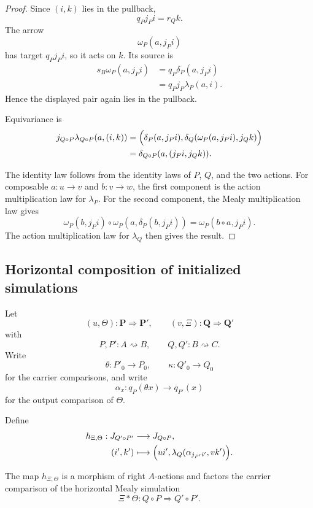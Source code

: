 \begin{proof}
Since \((i,k)\) lies in the pullback,
\[
  q_Pj_Pi=r_Qk.
\]
The arrow
\[
  \omega_P(a,j_Pi)
\]
has target \(q_Pj_Pi\), so it acts on \(k\). Its source is
\[
\begin{aligned}
  s_B\omega_P(a,j_Pi)
  &=
  q_P\delta_P(a,j_Pi)
  \\
  &=
  q_Pj_P\lambda_P(a,i).
\end{aligned}
\]
Hence the displayed pair again lies in the pullback.

Equivariance is
\[
\begin{aligned}
  j_{Q\circ P}
  \lambda_{Q\circ P}(a,(i,k))
  &=
  \Bigl(
    \delta_P(a,j_Pi),
    \delta_Q(\omega_P(a,j_Pi),j_Qk)
  \Bigr)
  \\
  &=
  \delta_{Q\circ P}
  (a,(j_Pi,j_Qk)).
\end{aligned}
\]

The identity law follows from the identity laws of \(P\), \(Q\), and the two actions. For composable
\(a:u\to v\) and \(b:v\to w\), the first component is the action multiplication law for
\(\lambda_P\). For the second component, the Mealy multiplication law gives
\[
  \omega_P(b,j_Pi)
  \circ
  \omega_P(a,\delta_P(b,j_Pi))
  =
  \omega_P(b\circ a,j_Pi).
\]
The action multiplication law for \(\lambda_Q\) then gives the result.
\end{proof}

\subsection{Horizontal composition of initialized simulations}

Let
\[
  (u,\Theta):\mathbf P\Longrightarrow\mathbf P',
  \qquad
  (v,\Xi):\mathbf Q\Longrightarrow\mathbf Q'
\]
with
\[
  P,P':A\rightsquigarrow B,
  \qquad
  Q,Q':B\rightsquigarrow C.
\]
Write
\[
  \theta:P'_0\to P_0,
  \qquad
  \kappa:Q'_0\to Q_0
\]
for the carrier comparisons, and write
\[
  \alpha_x:
  q_P(\theta x)\longrightarrow q_{P'}(x)
\]
for the output comparison of \(\Theta\).

Define
\[
\begin{aligned}
  h_{\Xi,\Theta}:
  J_{Q'\circ P'}
  &\longrightarrow
  J_{Q\circ P},
  \\
  (i',k')
  &\longmapsto
  \Bigl(
    ui',
    \lambda_Q(\alpha_{j_{P'}i'},vk')
  \Bigr).
\end{aligned}
\]

\begin{lemma}
\label{lem:horizontal-initialization-comparison}
The map \(h_{\Xi,\Theta}\) is a morphism of right \(A\)-actions and factors the carrier comparison of
the horizontal Mealy simulation
\[
  \Xi\ast\Theta:
  Q\circ P
  \Longrightarrow
  Q'\circ P'.
\]
\end{lemma}

